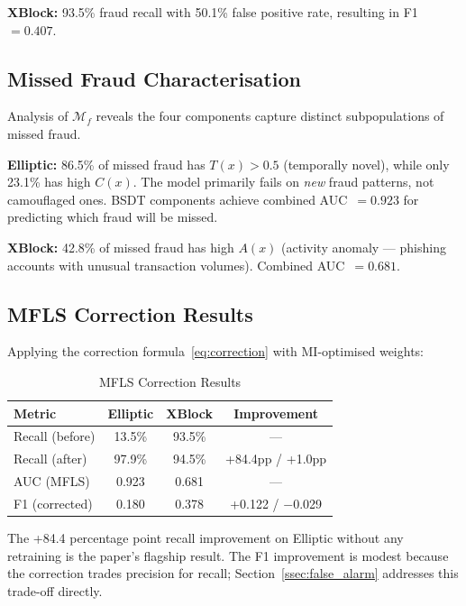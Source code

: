 \documentclass[journal]{IEEEtran}
\begin{document}
\textbf{XBlock:} 93.5\% fraud recall with 50.1\% false positive rate, resulting in F1~$= 0.407$.

\subsection{Missed Fraud Characterisation}
\label{ssec:characterisation}

Analysis of $\mathcal{M}_f$ reveals the four components capture distinct subpopulations of missed fraud.

\textbf{Elliptic:} 86.5\% of missed fraud has $T(x) > 0.5$ (temporally novel), while only 23.1\% has high $C(x)$. The model primarily fails on \textit{new} fraud patterns, not camouflaged ones. BSDT components achieve combined AUC~$= 0.923$ for predicting which fraud will be missed.

\textbf{XBlock:} 42.8\% of missed fraud has high $A(x)$ (activity anomaly --- phishing accounts with unusual transaction volumes). Combined AUC~$= 0.681$.

\subsection{MFLS Correction Results}
\label{ssec:mfls_results}

Applying the correction formula~\eqref{eq:correction} with MI-optimised weights:

\begin{table}[!t]
\centering
\caption{MFLS Correction Results}
\label{tab:mfls_results}
\begin{tabular}{@{}lccc@{}}
\toprule
\textbf{Metric} & \textbf{Elliptic} & \textbf{XBlock} & \textbf{Improvement} \\
\midrule
Recall (before)  & 13.5\%  & 93.5\% & --- \\
Recall (after)   & 97.9\%  & 94.5\% & +84.4pp / +1.0pp \\
AUC (MFLS)       & 0.923   & 0.681  & --- \\
F1 (corrected)   & 0.180   & 0.378  & +0.122 / $-$0.029 \\
\bottomrule
\end{tabular}
\end{table}

The +84.4 percentage point recall improvement on Elliptic without any retraining is the paper's flagship result. The F1 improvement is modest because the correction trades precision for recall; Section~\ref{ssec:false_alarm} addresses this trade-off directly.
\end{document}

